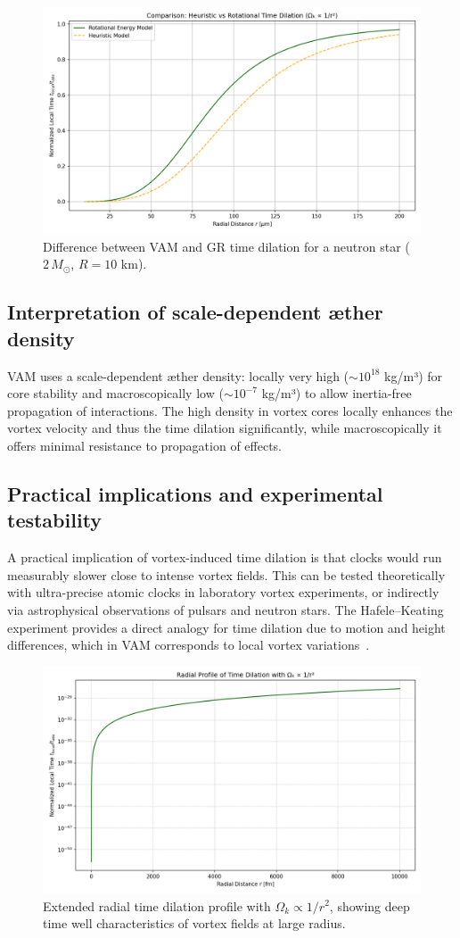 \begin{figure}[ht!]
    \centering
    \includegraphics[width=0.7\linewidth]{04-RotationalVsHeuristicTimeDilation}
    \caption{Difference between VAM and GR time dilation for a neutron star ($2\,M_\odot$, $R=10$ km).}
    \label{fig:comparisonVAMGR}
\end{figure}

\subsection{Interpretation of scale-dependent æther density}

VAM uses a scale-dependent æther density: locally very high ($\sim10^{18}$ kg/m³) for core stability and macroscopically low ($\sim10^{-7}$ kg/m³) to allow inertia-free propagation of interactions. The high density in vortex cores locally enhances the vortex velocity and thus the time dilation significantly, while macroscopically it offers minimal resistance to propagation of effects.

\subsection{Practical implications and experimental testability}

A practical implication of vortex-induced time dilation is that clocks would run measurably slower close to intense vortex fields. This can be tested theoretically with ultra-precise atomic clocks in laboratory vortex experiments, or indirectly via astrophysical observations of pulsars and neutron stars. The Hafele–Keating experiment provides a direct analogy for time dilation due to motion and height differences, which in VAM corresponds to local vortex variations~\cite{hafele1972around}.

\begin{figure}[ht!]
    \centering
    \includegraphics[width=0.7\linewidth]{05-LogarithmicDecayLocalTime}
    \caption{Extended radial time dilation profile with $\Omega_k \propto 1/r^2$, showing deep time well characteristics of vortex fields at large radius.}
    \label{fig:NewGraph}
\end{figure}